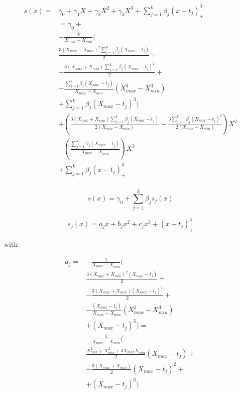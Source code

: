 \documentclass{article}
\begin{document}
\begin{equation*}
\begin{aligned}
s(x)=& \gamma_0+\gamma_1 X + \gamma_2 X^2 + \gamma_3 X^3 + \sum_{j=1}^k\beta_j (x-t_j)_{+}^3 \\
& =\gamma_0+ \\
&  -\frac{X}{X_{max}-X_{min}} \Biggl(  \\
&   \frac{3(X_{max}+X_{min})^2 \sum_{j=1}^k\beta_j (X_{max}-t_j) }{2} +\\
& - \frac{3(X_{max}+X_{min})  \sum_{j=1}^k\beta_j (X_{max}-t_j)^2  }{2} + \\
& -\frac{\sum_{j=1}^k\beta_j (X_{max}-t_j)}{X_{max}-X_{min}} (X_{max}^3-X^3_{min}) \\
& + \sum_{j=1}^k\beta_j (X_{max}-t_j)^3 \Biggr)\\
& +  \left( \frac{3(X_{max}+X_{min}) \sum_{j=1}^k\beta_j (X_{max}-t_j) }{2 (X_{max}-X_{min})} 
 -\frac{3  \sum_{j=1}^k\beta_j (X_{max}-t_j)^2  }{2 (X_{max}-X_{min})}\right) X^2\\
&  - \left( \frac{\sum_{j=1}^k\beta_j (X_{max}-t_j)}{X_{max}-X_{min}} \right) X^3\\
& + \sum_{j=1}^k\beta_j (x-t_j)_{+}^3\\
\end{aligned}
\end{equation*}

\[ s(x)=\gamma_0+\sum_{j=1}^k\beta_j s_j(x) \]
 
\[ s_j(x)=a_jx+b_j x^2+c_j x^3+ (x-t_j)_{+}^3 \]

with 

\begin{equation*}
\begin{aligned}
a_j=
&  -\frac{1}{X_{max}-X_{min}} \Biggl(  \\
&   \frac{3(X_{max}+X_{min})^2  (X_{max}-t_j) }{2} +\\
& - \frac{3(X_{max}+X_{min})   (X_{max}-t_j)^2  }{2} + \\
& -\frac{(X_{max}-t_j)}{X_{max}-X_{min}} (X_{max}^3-X^3_{min}) \\
& + (X_{max}-t_j)^3 \Biggr)=\\
&  -\frac{1}{X_{max}-X_{min}} \Biggl(  \\
&   \frac{X^2_{max}+X^2_{min}+4X_{max}X_{min}  }{2} (X_{max}-t_j)+\\
& - \frac{3(X_{max}+X_{min})}{2}(X_{max}-t_j)^2 + \\
& + (X_{max}-t_j)^3 \Biggr)
\end{aligned}
\end{equation*}
\end{document}
